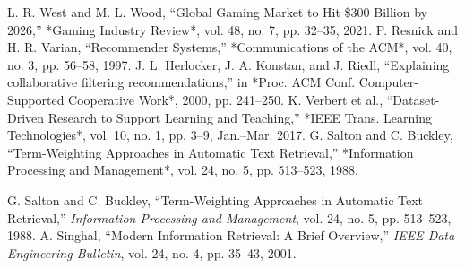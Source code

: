 \documentclass[conference]{IEEEtran}
\begin{document}
\begin{thebibliography}{99}

 L. R. West and M. L. Wood, ``Global Gaming Market to Hit \$300 Billion by 2026,'' *Gaming Industry Review*, vol. 48, no. 7, pp. 32–35, 2021.
 P. Resnick and H. R. Varian, ``Recommender Systems,'' *Communications of the ACM*, vol. 40, no. 3, pp. 56–58, 1997.
 J. L. Herlocker, J. A. Konstan, and J. Riedl, ``Explaining collaborative filtering recommendations,'' in *Proc. ACM Conf. Computer-Supported Cooperative Work*, 2000, pp. 241–250.
 K. Verbert et al., ``Dataset-Driven Research to Support Learning and Teaching,'' *IEEE Trans. Learning Technologies*, vol. 10, no. 1, pp. 3–9, Jan.–Mar. 2017.
 G. Salton and C. Buckley, ``Term-Weighting Approaches in Automatic Text Retrieval,'' *Information Processing and Management*, vol. 24, no. 5, pp. 513–523, 1988.

 G. Salton and C. Buckley, ``Term-Weighting Approaches in Automatic Text Retrieval,'' \textit{Information Processing and Management}, vol. 24, no. 5, pp. 513–523, 1988.
 A. Singhal, ``Modern Information Retrieval: A Brief Overview,'' \textit{IEEE Data Engineering Bulletin}, vol. 24, no. 4, pp. 35–43, 2001.


\end{thebibliography}
\end{document}
